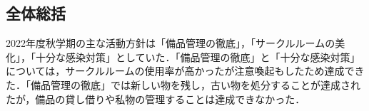 \subsection*{全体総括}

2022年度秋学期の主な活動方針は「備品管理の徹底」，「サークルルームの美化」，「十分な感染対策」としていた．「備品管理の徹底」と「十分な感染対策」については，サークルルームの使用率が高かったが注意喚起もしたため達成できた．「備品管理の徹底」では新しい物を残し，古い物を処分することが達成されたが，備品の貸し借りや私物の管理することは達成できなかった．